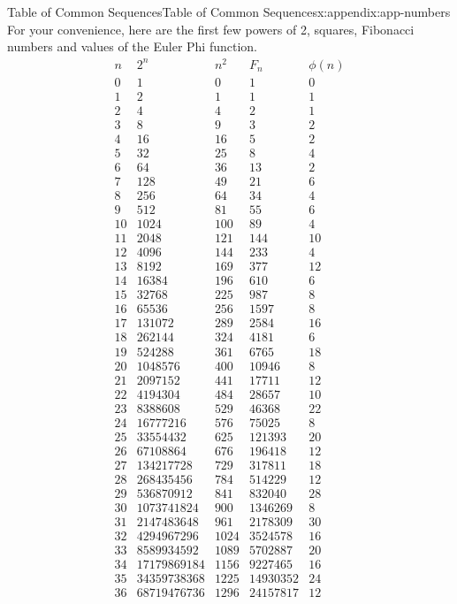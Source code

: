 \documentclass[twoside,10pt,]{book}
\numberwithin{equation}{section}
\begin{document}
\begin{appendixptx}{Table of Common Sequences}{}{Table of Common Sequences}{}{}{x:appendix:app-numbers}
For your convenience, here are the first few powers of 2, squares, Fibonacci numbers and values of the Euler Phi function.%
\begin{equation*}
\begin{array}{ccccc}
n & 2^n & n^2 &F_n & \phi(n) \\
0 &1 &0 &1 &0 \\
1 &2 &1 &1 &1 \\
2 &4 &4 &2 &1 \\
3 &8 &9 &3 &2 \\
4 &16 &16 &5 &2 \\
5 &32 &25 &8 &4 \\
6 &64 &36 &13 &2 \\
7 &128 &49 &21 &6 \\
8 &256 &64 &34 &4 \\
9 &512 &81 &55 &6 \\
10 &1024 &100 &89 &4 \\
11 &2048 &121 &144 &10 \\
12 &4096 &144 &233 &4 \\
13 &8192 &169 &377 &12 \\
14 &16384 &196 &610 &6 \\
15 &32768 &225 &987 &8 \\
16 &65536 &256 &1597 &8 \\
17 &131072 &289 &2584 &16 \\
18 &262144 &324 &4181 &6 \\
19 &524288 &361 &6765 &18 \\
20 &1048576 &400 &10946 &8 \\
21 &2097152 &441 &17711 &12 \\
22 &4194304 &484 &28657 &10 \\
23 &8388608 &529 &46368 &22 \\
24 &16777216 &576 &75025 &8 \\
25 &33554432 &625 &121393 &20 \\
26 &67108864 &676 &196418 &12 \\
27 &134217728 &729 &317811 &18 \\
28 &268435456 &784 &514229 &12 \\
29 &536870912 &841 &832040 &28 \\
30 &1073741824 &900 &1346269 &8 \\
31 &2147483648 &961 &2178309 &30 \\
32 &4294967296 &1024 &3524578 &16 \\
33 &8589934592 &1089 &5702887 &20 \\
34 &17179869184 &1156 &9227465 &16 \\
35 &34359738368 &1225 &14930352 &24 \\
36 &68719476736 &1296 &24157817 &12 \\
\end{array}
\end{equation*}
%
\end{appendixptx}
\end{document}
